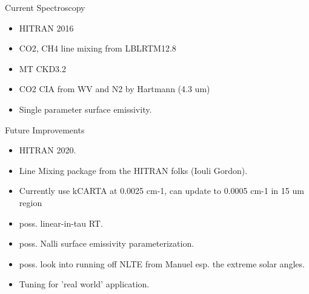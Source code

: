 \documentclass[10pt,t]{beamer}
\begin{document}
\begin{frame}{Current Spectroscopy}

  \begin{itemize}
  \item HITRAN 2016
  \item CO2, CH4 line mixing from LBLRTM12.8
  \item MT CKD3.2
  \item CO2 CIA from WV and N2 by Hartmann (4.3 um)
  \item Single parameter surface emissivity.
    

  \end{itemize}
\end{frame}
\begin{frame}{Future Improvements}

  \begin{itemize}
  \item HITRAN 2020.
  \item Line Mixing package from the HITRAN folks (Iouli Gordon).
  \item Currently use kCARTA at 0.0025 cm-1, can update to 0.0005 cm-1 in 15 um region
  \item poss. linear-in-tau RT.
  \item poss. Nalli surface emissivity parameterization.
  \item poss. look into running off NLTE from Manuel esp. the extreme solar angles.
  \item Tuning for 'real world' application.
      
  \end{itemize}
\end{frame}
\end{document}
